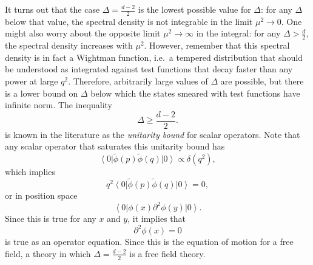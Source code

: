 \documentclass[a4paper,12pt]{article}
\newcommand{\ket}[1]{\left| #1 \right\rangle}
\newcommand{\bra}[1]{\left\langle #1 \right|}
\numberwithin{equation}{section}
\begin{document}
It turns out that the case $\Delta = \frac{d-2}{2}$ is the lowest possible value for $\Delta$: for any $\Delta$ below that value, the spectral density is not integrable in the limit $\mu^2 \to 0$.
One might also worry about the opposite limit $\mu^2 \to \infty$ in the integral: for any $\Delta > \frac{d}{2}$, the spectral density increases with $\mu^2$. However, remember that this spectral density is in fact a Wightman function, i.e.~a tempered distribution that should be understood as integrated against test functions that decay faster than any power at large $q^2$. Therefore, arbitrarily large values of $\Delta$ are possible, but there is a lower bound on $\Delta$ below which the states smeared with test functions have infinite norm.
The inequality
\begin{equation}
	\Delta \geq \frac{d-2}{2}.
	\label{eq:unitarybound:scalar}
\end{equation}
is known in the literature as the \emph{unitarity bound} for scalar operators. Note that any scalar operator that saturates this unitarity bound has
\begin{equation}
	\bra{0} \widetilde{\phi}(p) \widetilde{\phi}(q) \ket{0}
	\propto \delta(q^2),
\end{equation}
which implies
\begin{equation}
	q^2 \bra{0} \widetilde{\phi}(p) \widetilde{\phi}(q) \ket{0}
	= 0,
\end{equation}
or in position space
\begin{equation}
	\bra{0} \phi(x) \partial^2 \phi(y) \ket{0}.
\end{equation}
Since this is true for any $x$ and $y$, it implies that
\begin{equation}
	\partial^2 \phi(x) = 0
\end{equation}
is true as an operator equation. Since this is the equation of motion for a free field, a theory in which $\Delta = \frac{d-2}{2}$ is a free field theory.
\end{document}
